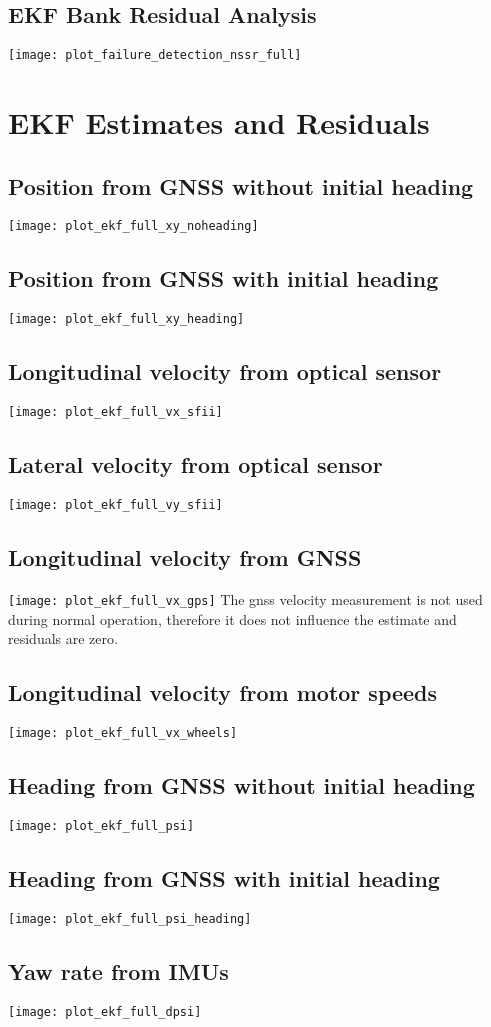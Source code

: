 \subsection{EKF Bank Residual Analysis}
\texttt{[image: plot\_failure\_detection\_nssr\_full]}

\section{EKF Estimates and Residuals}\label{sec:appendix-ekf}
\subsection{Position from GNSS without initial heading}
\texttt{[image: plot\_ekf\_full\_xy\_noheading]}
\subsection{Position from GNSS with initial heading}
\texttt{[image: plot\_ekf\_full\_xy\_heading]}
\subsection{Longitudinal velocity from optical sensor}
\texttt{[image: plot\_ekf\_full\_vx\_sfii]}
\subsection{Lateral velocity from optical sensor}
\texttt{[image: plot\_ekf\_full\_vy\_sfii]}
\subsection{Longitudinal velocity from GNSS}
\texttt{[image: plot\_ekf\_full\_vx\_gps]}
The \gls{gnss} velocity measurement is not used during normal operation, therefore it does not influence the estimate and residuals are zero.
\subsection{Longitudinal velocity from motor speeds}
\texttt{[image: plot\_ekf\_full\_vx\_wheels]}
\subsection{Heading from GNSS without initial heading}
\texttt{[image: plot\_ekf\_full\_psi]}
\subsection{Heading from GNSS with initial heading}
\texttt{[image: plot\_ekf\_full\_psi\_heading]}
\subsection{Yaw rate from IMUs}
\texttt{[image: plot\_ekf\_full\_dpsi]}
